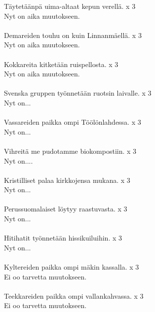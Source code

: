 
            Täytetäänpä uima-altaat kepun verellä. x 3 \\
            Nyt on aika muutokseen. \\
\hspace{10mm} \\
            Demareiden touhu on kuin Linnanmäellä. x 3  \\
            Nyt on aika muutokseen. \\
\hspace{10mm} \\
            Kokkareita kitketään ruispellosta. x 3  \\
            Nyt on aika muutokseen. \\
\hspace{10mm} \\
            Svenska gruppen työnnetään ruotsin laivalle. x 3  \\
            Nyt on... \\
\hspace{10mm} \\
            Vassareiden paikka ompi Töölönlahdessa. x 3  \\
            Nyt on... \\
\hspace{10mm} \\
            Vihreitä me pudotamme biokompostiin. x 3 \\
            Nyt on.... \\
\hspace{10mm} \\
            Kristilliset palaa kirkkojensa mukana. x 3 \\
            Nyt on... \\
\hspace{10mm} \\
            Perussuomalaiset löytyy raastuvasta. x 3  \\
            Nyt on... \\
\hspace{10mm} \\
            Hitihatit työnnetään hissikuiluihin. x 3 \\
            Nyt on... \\
\hspace{10mm} \\
            Kyltereiden paikka ompi mäkin kassalla. x 3  \\
            Ei oo tarvetta muutokseen. \\
\hspace{10mm} \\
            Teekkareiden paikka ompi vallankahvassa. x 3 \\
            Ei oo tarvetta muutokseen. \\
